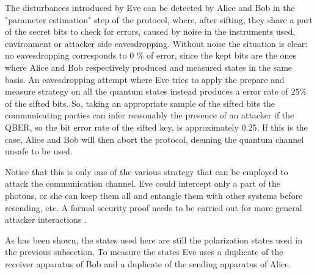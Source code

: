 The disturbances introduced by Eve can be detected by Alice and Bob in the
"parameter estimation" step of the protocol, where, after sifting,
they share a part of the secret bits
to check for errors, caused by noise in the instruments used,
environment or attacker side eavesdropping.
Without noise the situation is clear: no eavesdropping corresponds to
0 \% of error,
since the kept bits are the ones where Alice and Bob respectively produced and
measured states in the same basis. An eavesdropping attempt where Eve
tries to apply the
prepare and measure strategy on all the quantum states instead produces a
error rate of $25 \%$ of the sifted bits. So, taking an appropriate
sample of the sifted bits
the communicating parties can infer reasonably the presence of an attacker if
the QBER, so the bit error rate of the sifted key, is approximately 0.25.
If this is the case, Alice and Bob will then abort the protocol,
deeming the quantum channel unsafe
to be used.

Notice that this is only one of the various strategy that can be
employed to attack the
communication channel.
Eve could intercept only a part of the photons, or she can keep them
all and entangle
them with other systems before resending, etc. A formal
security proof needs to be
carried out for more general attacker
interactions \cite{wolf2021quantum}.

As has been shown, the states used here are still the polarization states
used in the previous subsection. To measure the
states Eve uses a duplicate of the
receiver apparatus of Bob and a duplicate of the sending apparatus of Alice.
